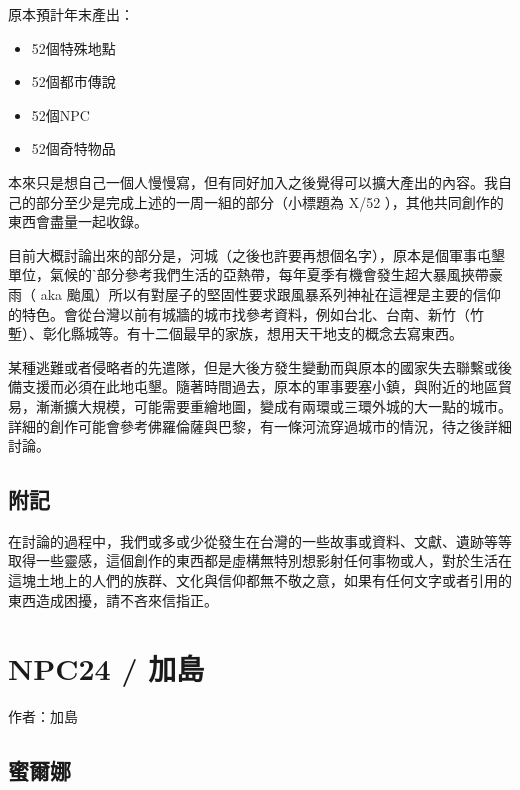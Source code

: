 \documentclass[10pt, a5paper]{article}
\newcommand{\attrib}[1]{%
\nopagebreak{\raggedleft\footnotesize #1\par}}
\begin{document}
\begin{CJK}{UTF8}{bsmi}
原本預計年末產出：

\begin{itemize}
  \item 52個特殊地點
  \item 52個都市傳說
  \item 52個NPC
  \item 52個奇特物品
\end{itemize}

本來只是想自己一個人慢慢寫，但有同好加入之後覺得可以擴大產出的內容。我自己的部分至少是完成上述的一周一組的部分（小標題為 X/52 ），其他共同創作的東西會盡量一起收錄。

目前大概討論出來的部分是，河城（之後也許要再想個名字），原本是個軍事屯墾單位，氣候的ˋ部分參考我們生活的亞熱帶，每年夏季有機會發生超大暴風挾帶豪雨（ aka 颱風）所以有對屋子的堅固性要求跟風暴系列神祉在這裡是主要的信仰的特色。會從台灣以前有城牆的城市找參考資料，例如台北、台南、新竹（竹塹）、彰化縣城等。有十二個最早的家族，想用天干地支的概念去寫東西。

某種逃難或者侵略者的先遣隊，但是大後方發生變動而與原本的國家失去聯繫或後備支援而必須在此地屯墾。隨著時間過去，原本的軍事要塞小鎮，與附近的地區貿易，漸漸擴大規模，可能需要重繪地圖，變成有兩環或三環外城的大一點的城市。詳細的創作可能會參考佛羅倫薩與巴黎，有一條河流穿過城市的情況，待之後詳細討論。

\subsection{附記}

在討論的過程中，我們或多或少從發生在台灣的一些故事或資料、文獻、遺跡等等取得一些靈感，這個創作的東西都是虛構無特別想影射任何事物或人，對於生活在這塊土地上的人們的族群、文化與信仰都無不敬之意，如果有任何文字或者引用的東西造成困擾，請不吝來信指正。

\attrib{老翰 2024.01.10}


\vfill
\pagebreak %




\section{NPC24 / 加島} 

作者：加島

\subsection{蜜爾娜}


\end{CJK}
\end{document}
